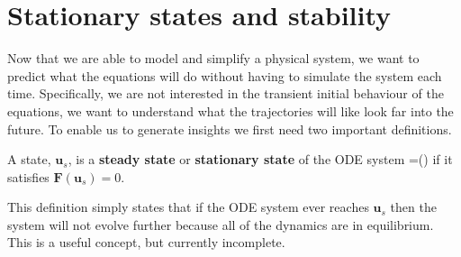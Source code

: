 \section{Stationary states and stability}\label{Stationary states and stability}
Now that we are able to model and simplify a physical system, we want to predict what the equations will do without having to simulate the system each time. Specifically, we are not interested in the transient initial behaviour of the equations, we want to understand what the trajectories will like look far into the future. To enable us to generate insights we first need two important definitions.
\begin{defin}
A state, $\bm{u}_s$, is a \textbf{steady state} or \textbf{stationary state} of the ODE system
\bb
{}=()
\ee
if it satisfies $\bm{F}(\bm{u}_s)=0$.
\end{defin}
This definition simply states that if the ODE system ever reaches $\bm{u}_s$ then the system will not evolve further because all of the dynamics are in equilibrium. This is a useful concept, but currently incomplete.

